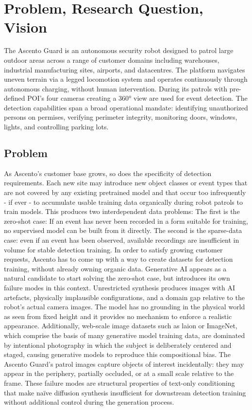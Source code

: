 \chapter{Problem, Research Question, Vision}
The Ascento Guard is an autonomous security robot designed to patrol large outdoor areas across a range of customer domains 
including warehouses, industrial manufacturing sites, airports, and datacentres. The platform navigates uneven 
terrain via a legged locomotion system and operates continuously through autonomous charging, without human 
intervention. During its patrols with pre-defined POI's four cameras creating a 360° view are used for event 
detection. The detection capabilities span a broad operational mandate: identifying unauthorized persons on 
permises, verifying perimeter integrity, monitoring doors, windows, lights, and controlling parking lots.


\section{Problem}
As Ascento's customer base grows, so does the specificity of detection requirements. 
Each new site may introduce new object classes or event types that are not covered by any existing 
pretrained model and that occur too infrequently - if ever - to accumulate usable training data organically 
during robot patrols to train models.
This produces two interdependent data problems:
The first is the zero-shot case: If an event has never been recorded in a form suitable for training, 
no supervised model can be built from it directly.
The second is the sparse-data case: even if an event has been observed, available recordings are insufficient 
in volume for stable detection training.
In order to satisfy growing customer requests, Ascento has to come up with a way to create datasets for detection 
training, without already owning organic data.
Generative AI appears as a natural candidate to start solving the zero-shot case,  but introduces its own failure 
modes in this context. Unrestricted synthesis produces images with AI artefacts, physically implausible 
configurations, and a domain gap relative to the robot's actual camera images. The model has no grounding in 
the physical world as seen from fixed height and it provides no mechanism to enforce a realistic appearance. 
Additionally, web-scale image datasets such as \gls{laion}\cite{laion} or ImageNet\cite{image-net}, 
which comprise the basis of many generative model training data, are dominated by intentional photography in which 
the subject is deliberately centered and staged, causing generative models to reproduce this compositional bias. 
The Ascento Guard's patrol images capture objects of interest incidentally: they may appear in the periphery, 
partially occluded, or at a small scale relative to the frame.
These failure modes are structural properties of text-only conditioning that make naïve diffusion synthesis 
insufficient for downstream detection training without additional control during the generation process.



